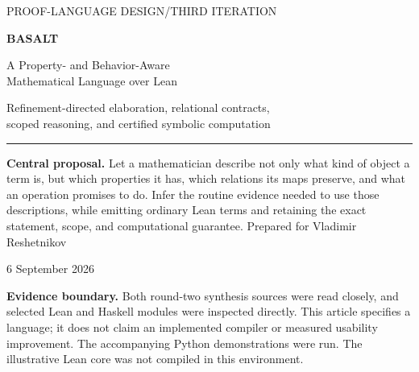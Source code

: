 \documentclass[11pt,a4paper]{article}
\theoremstyle{plain}
\theoremstyle{definition}
\theoremstyle{remark}
\begin{document}
\begin{titlepage}
{\sffamily\color{accent}\large PROOF-LANGUAGE DESIGN\quad /\quad THIRD ITERATION\par}
\vspace{20mm}
{\sffamily\bfseries\color{ink}\fontsize{42}{46}\selectfont BASALT\par}
\vspace{7mm}
{\sffamily\color{ink}\fontsize{24}{29}\selectfont A Property- and Behavior-Aware\\Mathematical Language over Lean\par}
\vspace{9mm}
{\large Refinement-directed elaboration, relational contracts,\\scoped reasoning, and certified symbolic computation\par}
\vspace{12mm}
\rule{\textwidth}{.7pt}
\vspace{3mm}
\textbf{Central proposal.} Let a mathematician describe not only what kind of
object a term is, but which properties it has, which relations its maps preserve,
and what an operation promises to do. Infer the routine evidence needed to use
those descriptions, while emitting ordinary Lean terms and retaining the exact
statement, scope, and computational guarantee.
\vfill
Prepared for Vladimir Reshetnikov\par
6 September 2026\par
\vspace{4mm}
{\small\color{muted}\textbf{Evidence boundary.} Both round-two synthesis sources
were read closely, and selected Lean and Haskell modules were inspected directly.
This article specifies a language; it does not claim an implemented compiler or
measured usability improvement. The accompanying Python demonstrations were run.
The illustrative Lean core was not compiled in this environment.}
\end{titlepage}
\end{document}
